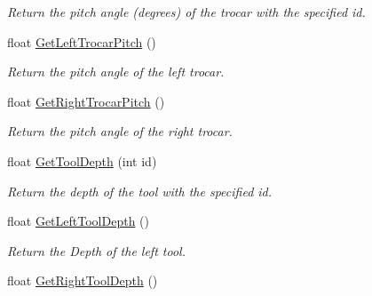 \begin{DoxyCompactItemize}
\begin{DoxyCompactList}\small\item\em Return the pitch angle (degrees) of the trocar with the specified id. \item\end{DoxyCompactList}\item 
\hypertarget{classvtkIHP_ab3d0c4abab29636780dbd41c94b96992}{
float \hyperlink{classvtkIHP_ab3d0c4abab29636780dbd41c94b96992}{GetLeftTrocarPitch} ()}
\label{classvtkIHP_ab3d0c4abab29636780dbd41c94b96992}

\begin{DoxyCompactList}\small\item\em Return the pitch angle of the left trocar. \item\end{DoxyCompactList}\item 
\hypertarget{classvtkIHP_aa1d8a3f66a09a179d43bfa0c685f3c58}{
float \hyperlink{classvtkIHP_aa1d8a3f66a09a179d43bfa0c685f3c58}{GetRightTrocarPitch} ()}
\label{classvtkIHP_aa1d8a3f66a09a179d43bfa0c685f3c58}

\begin{DoxyCompactList}\small\item\em Return the pitch angle of the right trocar. \item\end{DoxyCompactList}\item 
\hypertarget{classvtkIHP_a343a91efbbf70eeb07b0715d3dc75877}{
float \hyperlink{classvtkIHP_a343a91efbbf70eeb07b0715d3dc75877}{GetToolDepth} (int id)}
\label{classvtkIHP_a343a91efbbf70eeb07b0715d3dc75877}

\begin{DoxyCompactList}\small\item\em Return the depth of the tool with the specified id. \item\end{DoxyCompactList}\item 
\hypertarget{classvtkIHP_aa086fedb70ad3c6cd95b38bdbd54c309}{
float \hyperlink{classvtkIHP_aa086fedb70ad3c6cd95b38bdbd54c309}{GetLeftToolDepth} ()}
\label{classvtkIHP_aa086fedb70ad3c6cd95b38bdbd54c309}

\begin{DoxyCompactList}\small\item\em Return the Depth of the left tool. \item\end{DoxyCompactList}\item 
\hypertarget{classvtkIHP_a0d3f18bd000b9e1f76714fa12e195bcb}{
float \hyperlink{classvtkIHP_a0d3f18bd000b9e1f76714fa12e195bcb}{GetRightToolDepth} ()}
\label{classvtkIHP_a0d3f18bd000b9e1f76714fa12e195bcb}


\end{DoxyCompactItemize}
